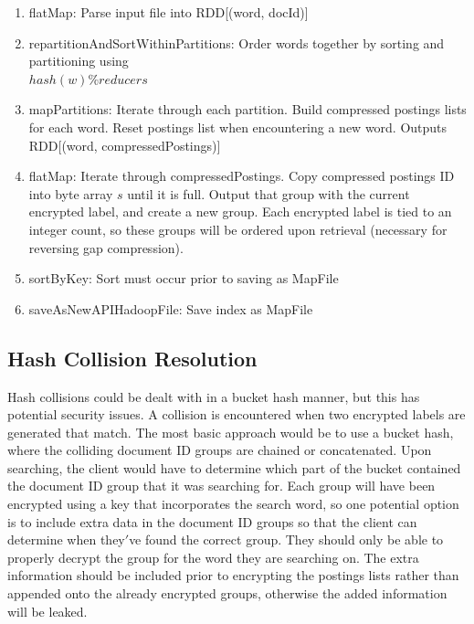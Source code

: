 \documentclass{sig-alternate-05-2015}
\begin{document}
\begin{enumerate}
\item flatMap: Parse input file into RDD[(word, docId)]
\item repartitionAndSortWithinPartitions: Order words together by sorting and partitioning using \\
$hash(w)\%reducers$

\item mapPartitions: Iterate through each partition. Build compressed postings lists for each word. Reset postings list when encountering a new word. Outputs \\ RDD[(word, compressedPostings)]

\item flatMap: Iterate through compressedPostings. Copy compressed postings ID into byte array $s$ until it is full. Output that group with the current encrypted label, and create a new group. Each encrypted label is tied to an integer count, so these groups will be ordered upon retrieval (necessary for reversing gap compression).

\item sortByKey: Sort must occur prior to saving as MapFile

\item saveAsNewAPIHadoopFile: Save index as MapFile
\end{enumerate}

\subsection{Hash Collision Resolution}
Hash collisions could be dealt with in a bucket hash manner, but this has potential security issues. A collision is encountered when two encrypted labels are generated that match. The most basic approach would be to use a bucket hash, where the colliding document ID groups are chained or concatenated. Upon searching, the client would have to determine which part of the bucket contained the document ID group that it was searching for. Each group will have been encrypted using a key that incorporates the search word, so one potential option is to include extra data in the document ID groups so that the client can determine when they$'$ve found the correct group. They should only be able to properly decrypt the group for the word they are searching on. The extra information should be included prior to encrypting the postings lists rather than appended onto the already encrypted groups, otherwise the added information will be leaked.
\end{document}
